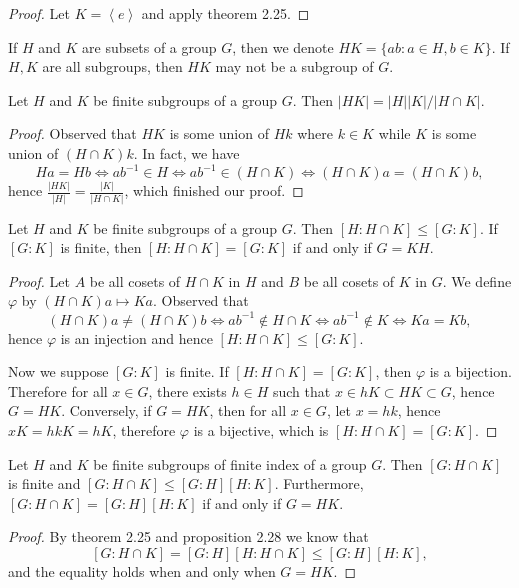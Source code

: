 \begin{proof}
Let $K=\left<e\right>$ and apply theorem 2.25.
\end{proof}
If $H$ and $K$ are subsets of a group $G$, then we denote $HK=\{ab:a\in H,b\in K\}$. If $H,K$ are all subgroups, then $HK$ may not be a subgroup of $G$.
\begin{theorem}
Let $H$ and $K$ be finite subgroups of a group $G$. Then $|HK|=|H||K|/|H\cap K|$.
\end{theorem}
\begin{proof}
Observed that $HK$ is some union of $Hk$ where $k\in K$ while $K$ is some union of $(H\cap K)k$. In fact, we have
$$
Ha=Hb\Leftrightarrow ab^{-1}\in H\Leftrightarrow ab^{-1}\in \left( H\cap K \right) \Leftrightarrow \left( H\cap K \right) a=\left( H\cap K \right) b,
$$
hence 
$\frac{\left| HK \right|}{\left| H \right|}=\frac{\left| K \right|}{\left| H\cap K \right|}$, which finished our proof.
\end{proof}
\begin{proposition}
Let $H$ and $K$ be finite subgroups of a group $G$. Then $[H:H\cap K]\le[G:K]$. If $[G:K]$ is finite, then $[H:H\cap K]=[G:K]$ if and only if $G=KH$.
\end{proposition}
\begin{proof}
Let $A$ be all cosets of $H\cap K$ in $H$ and $B$ be all cosets of $K$ in $G$. We define $\varphi$ by $(H\cap K)a\mapsto Ka$. Observed that 
$$
\left( H\cap K \right) a\ne \left( H\cap K \right) b\Leftrightarrow ab^{-1}\notin H\cap K\Leftrightarrow ab^{-1}\notin K\Leftrightarrow Ka=Kb,
$$
hence $\varphi$ is an injection and hence $[H:H\cap K]\le[G:K]$.\par
Now we suppose $[G:K]$ is finite. If $[H:H\cap K]=[G:K]$, then $\varphi$ is a bijection. Therefore for all $x\in G$, there exists $h\in H$ such that $x\in hK\subset HK\subset G$, hence $G=HK$. Conversely, if $G=HK$, then for all $x\in G$, let $x=hk$, hence $xK=hkK=hK$, therefore $\varphi$ is a bijective, which is $[H:H\cap K]=[G:K]$.
\end{proof}
\begin{proposition}
Let $H$ and $K$ be finite subgroups of finite index of a group $G$. Then $[G:H\cap K]$ is finite and $[G:H\cap K]\le[G:H][H:K]$. Furthermore, $[G:H\cap K]=[G:H][H:K]$ if and only if $G=HK$.
\end{proposition}
\begin{proof}
By theorem 2.25 and proposition 2.28 we know that 
$$
\left[ G:H\cap K \right] =\left[ G:H \right] \left[ H:H\cap K \right] \le \left[ G:H \right] \left[ H:K \right] ,
$$
and the equality holds when and only when $G=HK$.
\end{proof}
